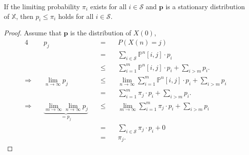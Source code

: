 \begin{inequality} \label{ineq:p-le-pi}
If the limiting probability $ \pi_{i} $ exists for all $ i \in \mathcal{S} $ and $ \mathbf{p} $ is a stationary distribution of $ \mathbb{X} $, then $ p_{i} \le \pi_{i} $ holds for all $ i \in \mathcal{S} $.

\begin{proof}
Assume that $ \mathbf{p} $ is the distribution of $ X(0) $,
\begin{alignat*}{4}
  & p_{j}
    & \quad=\quad & P(X(n) = j) \\
  & & \quad=\quad & \sum_{i \in \mathcal{S}} \mathbb{P}^{n}[i, j] \cdot p_{i} \\
  & & \quad\le\quad & \sum_{i = 1}^{m} \mathbb{P}^{n}[i, j] \cdot p_{i} + \sum_{i > m} p_{i}. \\
\Rightarrow\quad
  & \lim_{n \to \infty} p_{j}
    & \quad\le\quad & \lim_{n \to \infty} \sum_{i = 1}^{m} \mathbb{P}^{n}[i, j] \cdot p_{i} + \sum_{i > m} p_{i} \\
  & & \quad=\quad & \sum_{i = 1}^{m} \pi_{j} \cdot p_{i} + \sum_{i > m} p_{i}. \\
\Rightarrow\quad
  & \underbrace{\lim_{m \to \infty} \lim_{n \to \infty} p_{j}}_{= p_{j}}
    & \quad\le\quad & \lim_{m \to \infty} \sum_{i = 1}^{m} \pi_{j} \cdot p_{i} + \sum_{i > m} p_{i} \\
  & & \quad=\quad & \sum_{i \in \mathcal{S}} \pi_{j} \cdot p_{i} + 0 \\
  & & \quad=\quad & \pi_{j}.
\end{alignat*}
\end{proof}
\end{inequality}

